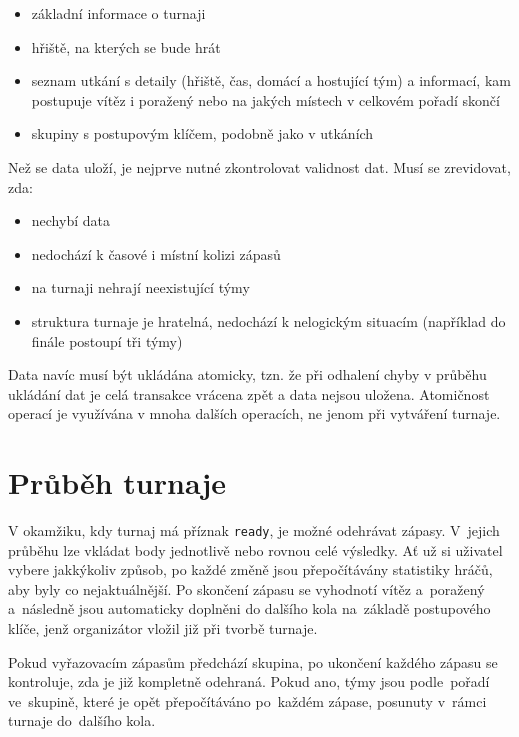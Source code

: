 \begin{itemize}
 \item základní informace o turnaji
 \item hřiště, na kterých se bude hrát
 \item seznam utkání s detaily (hřiště, čas, domácí a hostující tým) a informací, kam postupuje vítěz i poražený nebo na jakých místech v celkovém pořadí skončí
 \item skupiny s postupovým klíčem, podobně jako v utkáních
\end{itemize}

Než se data uloží, je nejprve nutné zkontrolovat validnost dat. Musí se zrevidovat, zda: 

\begin{itemize}
 \item nechybí data
 \item nedochází k časové i místní kolizi zápasů
 \item na turnaji nehrají neexistující týmy
 \item struktura turnaje je hratelná, nedochází k nelogickým situacím (například do finále postoupí tři týmy)
\end{itemize}

Data navíc musí být ukládána atomicky, tzn. že při odhalení chyby v průběhu ukládání dat je celá transakce
vrácena zpět a data nejsou uložena. Atomičnost operací je využívána v mnoha dalších operacích,
ne jenom při vytváření turnaje.

\section{Průběh turnaje}

V okamžiku, kdy turnaj má příznak \texttt{ready}, je možné odehrávat zápasy.
V~jejich průběhu lze vkládat body jednotlivě nebo rovnou celé výsledky.
Ať už si uživatel vybere jakkýkoliv způsob, po každé změně jsou přepočítávány
statistiky hráčů, aby byly co nejaktuálnější. Po skončení zápasu se vyhodnotí vítěz
a~poražený a~následně jsou automaticky doplněni do dalšího kola na~základě postupového klíče,
jenž organizátor vložil již při tvorbě turnaje.

Pokud vyřazovacím zápasům předchází skupina, po ukončení každého zápasu se kontroluje,
zda je již kompletně odehraná. Pokud ano, týmy jsou podle~pořadí ve~skupině, které je
opět přepočítáváno po~každém zápase, posunuty v~rámci turnaje do~dalšího kola.


